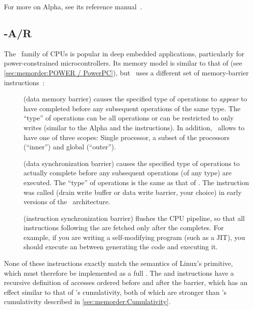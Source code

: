 For more on Alpha, see its reference manual~\cite{ALPHA2002}.

\subsection{-A/R}
\label{sec:memorder:ARMv7-A/R}

The \ARM\ family of CPUs is popular in deep embedded applications,
particularly for power-constrained microcontrollers.
Its memory model is similar to that of \Power{}
(see \cref{sec:memorder:POWER / PowerPC}), but \ARM\ uses a
different set of memory-barrier instructions~\cite{ARMv7A:2010}:

\begin{description}
\item	[] (data memory barrier) causes the specified type of
	operations to \emph{appear} to have completed before any
	subsequent operations of the same type.
	The ``type'' of operations can be all operations or can be
	restricted to only writes (similar to the Alpha 
	and the \Power{}  instructions).
	In addition, \ARM\ allows  to have one of three
	scopes:
	Single processor, a subset of the processors
	(``inner'') and global (``outer'').
\item	[] (data synchronization barrier) causes the specified
	type of operations to actually complete before any subsequent
	operations (of any type) are executed.
	The ``type'' of operations is the same as that of .
	The  instruction was called  (drain write buffer
	or data write barrier, your choice) in early versions of the
	\ARM\ architecture.
\item	[] (instruction synchronization barrier) flushes the CPU
	pipeline, so that all instructions following the 
	are fetched only after the  completes.
	For example, if you are writing a self-modifying program
	(such as a JIT), you should execute an  between
	generating the code and executing it.
\end{description}

None of these instructions exactly match the semantics of Linux's
 primitive, which must therefore be implemented as a full
.
The  and  instructions have a recursive definition
of accesses ordered before and after the barrier, which has an effect
similar to that of \Power{}'s cumulativity, both of which are
stronger than 's cumulativity described in
\cref{sec:memorder:Cumulativity}.

